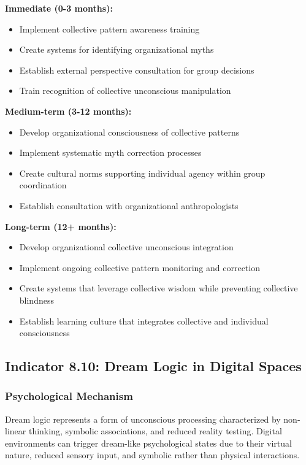 \documentclass[11pt,a4paper]{article}
\begin{document}
\textbf{Immediate (0-3 months):}
\begin{itemize}
\item Implement collective pattern awareness training
\item Create systems for identifying organizational myths
\item Establish external perspective consultation for group decisions
\item Train recognition of collective unconscious manipulation
\end{itemize}

\textbf{Medium-term (3-12 months):}
\begin{itemize}
\item Develop organizational consciousness of collective patterns
\item Implement systematic myth correction processes
\item Create cultural norms supporting individual agency within group coordination
\item Establish consultation with organizational anthropologists
\end{itemize}

\textbf{Long-term (12+ months):}
\begin{itemize}
\item Develop organizational collective unconscious integration
\item Implement ongoing collective pattern monitoring and correction
\item Create systems that leverage collective wisdom while preventing collective blindness
\item Establish learning culture that integrates collective and individual consciousness
\end{itemize}

\subsection{Indicator 8.10: Dream Logic in Digital Spaces}

\subsubsection{Psychological Mechanism}

Dream logic represents a form of unconscious processing characterized by non-linear thinking, symbolic associations, and reduced reality testing. Digital environments can trigger dream-like psychological states due to their virtual nature, reduced sensory input, and symbolic rather than physical interactions\cite{turkle2011}.
\end{document}
